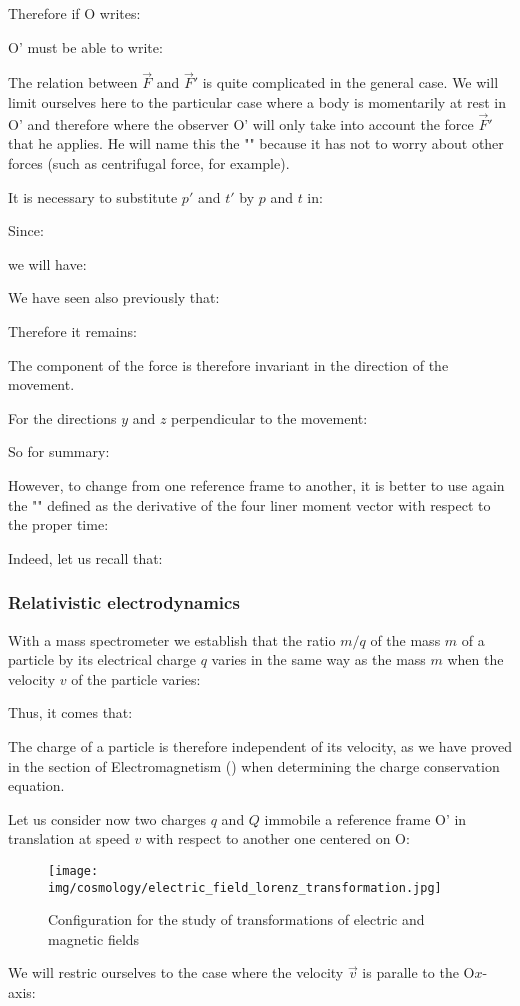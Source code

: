	Therefore if O writes:
	
	O' must be able to write:
	
	The relation between $\vec{F}$ and $\vec{F}'$ is quite complicated in the general case. We will limit ourselves here to the particular case where a body is momentarily at rest in O' and therefore where the observer O' will only take into account the force $\vec{F}'$ that he applies. He will name this the "" because it has not to worry about other forces (such as centrifugal force, for example).

	It is necessary to substitute $p'$ and $t'$ by $p$ and $t$ in:
	
	Since:
	
	we will have:
	
	We have seen also previously that:
	
	Therefore it remains:
	
	The component of the force is therefore invariant in the direction of the movement.

	For the directions $y$ and $z$ perpendicular to the movement:
	
	So for summary:
	
	However, to change from one reference frame to another, it is better to use again the "" defined as the derivative of the four liner moment vector with respect to the proper time:
	
	Indeed, let us recall that:
	
	
	\pagebreak
	\subsubsection{Relativistic electrodynamics}\label{relativistic electrodynamics}
	With a mass spectrometer we establish that the ratio $m / q$ of the mass $m$ of a particle by its electrical charge $q$ varies in the same way as the mass $m$ when the velocity $v$ of the particle varies:
	
	Thus, it comes that:
	
	The charge of a particle is therefore independent of its velocity, as we have proved in the section of Electromagnetism () when determining the charge conservation equation.

	Let us consider now two charges $q$ and $Q$ immobile a reference frame O' in translation at speed $v$ with respect to another one centered on O:
	\begin{figure}[H]
		\centering
		\texttt{[image: img/cosmology/electric\_field\_lorenz\_transformation.jpg]}
		\caption{Configuration for the study of transformations of electric and magnetic fields}
	\end{figure}
	We will restric ourselves to the case where the velocity $\vec{v}$ is paralle to the O$x$-axis:
	
